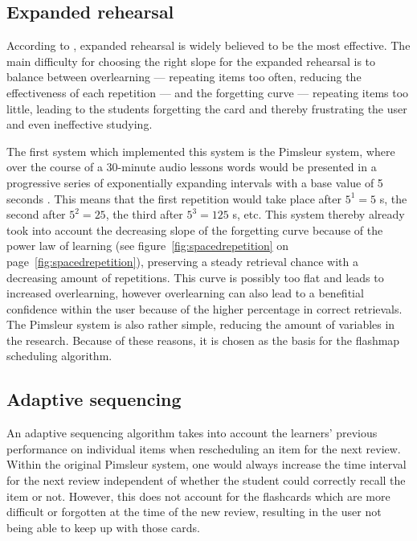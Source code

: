         \subsection{Expanded rehearsal}

According to , expanded rehearsal is widely believed to be the most effective. The main difficulty for choosing the right slope for the expanded rehearsal is to balance between overlearning --- repeating items too often, reducing the effectiveness of each repetition --- and the forgetting curve --- repeating items too little, leading to the students forgetting the card and thereby frustrating the user and even ineffective studying.

The first system which implemented this system is the Pimsleur system, where over the course of a 30-minute audio lessons words would be presented in a progressive series of exponentially expanding intervals with a base value of 5 seconds \cite{microlearning}. This means that the first repetition would take place after $5^1=5$ s, the second after $5^2=25$, the third after $5^3=125$ s, etc. This system thereby already took into account the decreasing slope of the forgetting curve because of the power law of learning (see figure~\ref{fig:spacedrepetition} on page~\ref{fig:spacedrepetition}), preserving a steady retrieval chance with a decreasing amount of repetitions. This curve is possibly too flat and leads to increased overlearning, however overlearning can also lead to a benefitial confidence within the user because of the higher percentage in correct retrievals. The Pimsleur system is also rather simple, reducing the amount of variables in the research. Because of these reasons, it is chosen as the basis for the flashmap scheduling algorithm.

        \subsection{Adaptive sequencing}
        \label{subsec:adaptivesequencing}

An adaptive sequencing algorithm takes into account the learners' previous performance on individual items when rescheduling an item for the next review. Within the original Pimsleur system, one would always increase the time interval for the next review independent of whether the student could correctly recall the item or not. However, this does not account for the flashcards which are more difficult or forgotten at the time of the new review, resulting in the user not being able to keep up with those cards.

